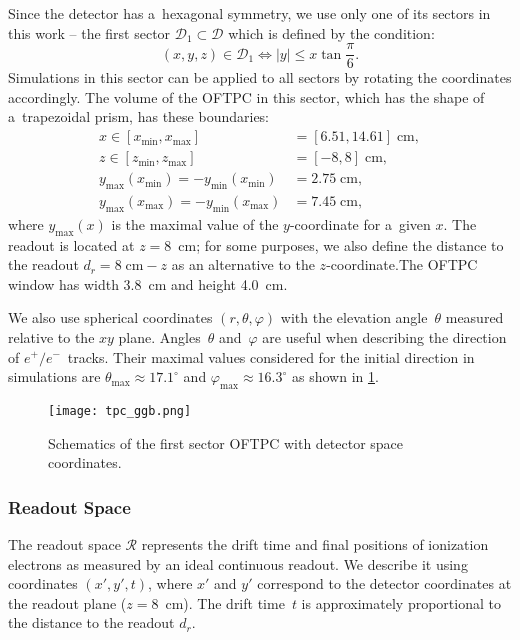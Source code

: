 				Since the detector has a~hexagonal symmetry, we use only one of its sectors in this work -- the first sector $\mathcal{D}_1 \subset \mathcal{D}$ which is defined by the condition:
					\begin{equation}
						(x,y,z) \in \mathcal{D}_1 \Leftrightarrow |y| \leq x\tan \frac{\pi}{6}.
					\end{equation}
				Simulations in this sector can be applied to all sectors by rotating the coordinates accordingly. The volume of the \ac{OFTPC} in this sector, which has the shape of a~trapezoidal prism, has these boundaries:
					\begin{align}
						x \in [x_\text{min},x_\text{max}] &= [6.51, 14.61] \;\text{cm},\\
						z \in [z_\text{min},z_\text{max}] &= [-8,8] \;\text{cm},\\
						y_\text{max}(x_\text{min}) = -y_\text{min}(x_\text{min}) &=  2.75\;\text{cm},\\
						y_\text{max}(x_\text{max}) = -y_\text{min}(x_\text{max}) &=  7.45\;\text{cm},
					\end{align}
				where $y_\text{max}(x)$ is the maximal value of the $y$-coordinate for a~given $x$. The readout is located at $z = 8$~cm; for some purposes, we also define the distance to the readout $d_r = 8\;\text{cm}-z$ as an alternative to the $z$-coordinate.The \ac{OFTPC} window has width 3.8~cm and height 4.0~cm.
				
				We also use spherical coordinates $(r,\theta,\varphi)$ with the elevation angle~$\theta$ measured relative to the $xy$ plane. Angles~$\theta$ and~$\varphi$ are useful when describing the direction of $e^+/e^-$~tracks. Their maximal values considered for the initial direction in simulations are $\theta_\text{max} \approx 17.1^\circ$ and $\varphi_\text{max} \approx 16.3^\circ$ as shown in \cref{fig:oftpc}.
				
				\begin{figure}
					\centering
					\texttt{[image: tpc\_ggb.png]}
					\caption{Schematics of the first sector \ac{OFTPC} with detector space coordinates.}
					\label{fig:oftpc}
				\end{figure}
			
			\subsubsection{Readout Space}
				The readout space $\mathcal{R}$ represents the drift time and final positions of ionization electrons as measured by an ideal continuous readout. We describe it using coordinates $(x',y',t)$, where $x'$ and $y'$ correspond to the detector coordinates at the readout plane ($z = 8$~cm). The drift time~$t$ is approximately proportional to the distance to the readout $d_r$.
			
